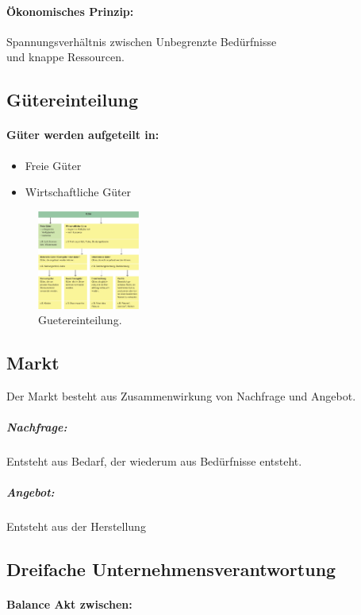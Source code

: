 \documentclass[../ZF_Wing.tex]{subfiles}
\begin{document}
\paragraph{Ökonomisches Prinzip:}
Spannungsverhältnis zwischen Unbegrenzte Bedürfnisse\\
und knappe Ressourcen.

\subsection{Gütereinteilung}
\paragraph{Güter werden aufgeteilt in:}

\begin{itemize}
\item Freie Güter
\item Wirtschaftliche Güter
\end{itemize}

\begin{figure}[H]
\centering
\includegraphics[width=0.3\textwidth]{Resources/Image/Guetereinteilung.png}
\caption{\label{fig:Guetereinteilung}Guetereinteilung.}
\end{figure}


\subsection{Markt}
Der Markt besteht aus Zusammenwirkung von Nachfrage und Angebot. \\
\subparagraph{Nachfrage:} Entsteht aus Bedarf, der wiederum aus Bedürfnisse entsteht.
\subparagraph{Angebot:} 
Entsteht aus der Herstellung


\subsection{Dreifache Unternehmensverantwortung}
\paragraph{Balance Akt zwischen:} 
\end{document}
